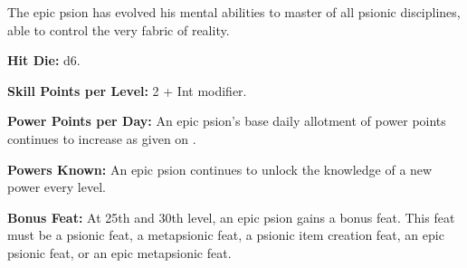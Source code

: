 The epic psion has evolved his mental abilities to master of all psionic disciplines, able to control the very fabric of reality.

\textbf{Hit Die:} d6.

\textbf{Skill Points per Level:} 2 + Int modifier.

\textbf{Power Points per Day:} An epic psion's base daily allotment of power points continues to increase as given on .

\textbf{Powers Known:} An epic psion continues to unlock the knowledge of a new power every level.

\textbf{Bonus Feat:} At 25th and 30th level, an epic psion gains a bonus feat. This feat must be a psionic feat, a metapsionic feat, a psionic item creation feat, an epic psionic feat, or an epic metapsionic feat.












